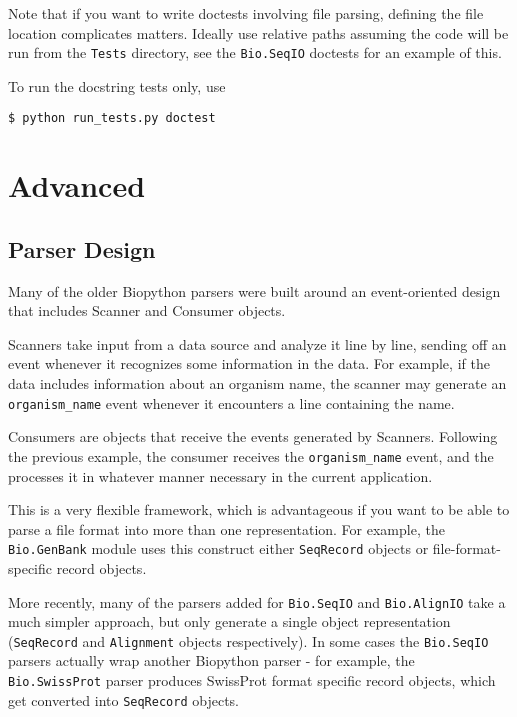 \documentclass{report}
\begin{document}
Note that if you want to write doctests involving file parsing, defining
the file location complicates matters.  Ideally use relative paths assuming
the code will be run from the \verb|Tests| directory, see the
\verb|Bio.SeqIO| doctests for an example of this.

To run the docstring tests only, use
\begin{verbatim}
$ python run_tests.py doctest
\end{verbatim}

\chapter{Advanced}
\label{chapter:advanced}

\section{Parser Design}

Many of the older Biopython parsers were built around an event-oriented
design that includes Scanner and Consumer objects.

Scanners take input from a data source and analyze it line by line,
sending off an event whenever it recognizes some information in the
data.  For example, if the data includes information about an organism
name, the scanner may generate an \verb|organism_name| event whenever it
encounters a line containing the name.

Consumers are objects that receive the events generated by Scanners.
Following the previous example, the consumer receives the
\verb|organism_name| event, and the processes it in whatever manner
necessary in the current application.

This is a very flexible framework, which is advantageous if you want to
be able to parse a file format into more than one representation.  For
example, the \verb|Bio.GenBank| module uses this construct either
\verb|SeqRecord| objects or file-format-specific record objects.

More recently, many of the parsers added for \verb|Bio.SeqIO| and
\verb|Bio.AlignIO| take a much simpler approach, but only generate a
single object representation (\verb|SeqRecord| and \verb|Alignment| objects
respectively). In some cases the \verb|Bio.SeqIO| parsers actually wrap
another Biopython parser - for example, the \verb|Bio.SwissProt| parser
produces SwissProt format specific record objects, which get converted
into \verb|SeqRecord| objects.
\end{document}
